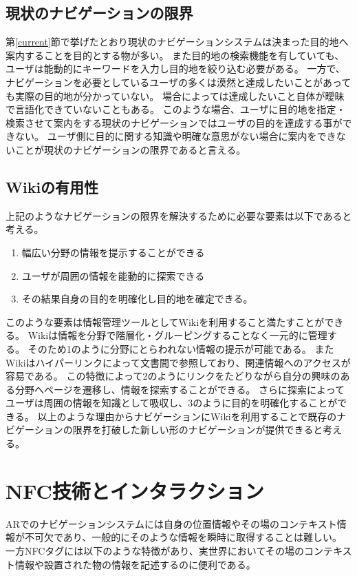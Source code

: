 \subsection{現状のナビゲーションの限界}
第\ref{current}節で挙げたとおり現状のナビゲーションシステムは決まった目的地へ案内することを目的とする物が多い。
また目的地の検索機能を有していても、ユーザは能動的にキーワードを入力し目的地を絞り込む必要がある。
一方で、ナビゲーションを必要としているユーザの多くは漠然と達成したいことがあっても実際の目的地が分かっていない。
場合によっては達成したいこと自体が曖昧で言語化できていないこともある。
このような場合、ユーザに目的地を指定・検索させて案内をする現状のナビゲーションではユーザの目的を達成する事ができない。
ユーザ側に目的に関する知識や明確な意思がない場合に案内をできないことが現状のナビゲーションの限界であると言える。

\subsection{Wikiの有用性}
上記のようなナビゲーションの限界を解決するために必要な要素は以下であると考える。
\begin{enumerate}
  \item 幅広い分野の情報を提示することができる
  \item ユーザが周囲の情報を能動的に探索できる
  \item その結果自身の目的を明確化し目的地を確定できる。
\end{enumerate}
このような要素は情報管理ツールとしてWikiを利用すること満たすことができる。
Wikiは情報を分野で階層化・グルーピングすることなく一元的に管理する。
そのため1のように分野にとらわれない情報の提示が可能である。
またWikiはハイパーリンクによって文書間で参照しており、関連情報へのアクセスが容易である。
この特徴によって2のようにリンクをたどりながら自分の興味のある分野へページを遷移し、情報を探索することができる。
さらに探索によってユーザは周囲の情報を知識として吸収し、3のように目的を明確化することができる。
以上のような理由からナビゲーションにWikiを利用することで既存のナビゲーションの限界を打破した新しい形のナビゲーションが提供できると考える。


\section{NFC技術とインタラクション}
ARでのナビゲーションシステムには自身の位置情報やその場のコンテキスト情報が不可欠であり、一般的にそのような情報を瞬時に取得することは難しい。
一方NFCタグには以下のような特徴があり、実世界においてその場のコンテキスト情報や設置された物の情報を記述するのに便利である。

